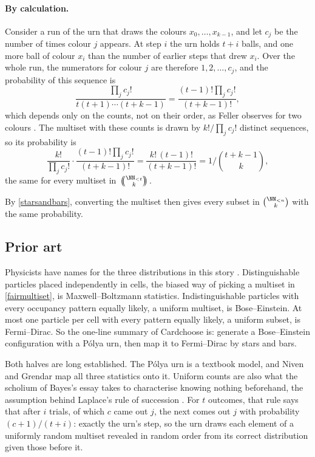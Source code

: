 \documentclass[letterpaper,11pt]{article}
\newcommand{\multichoose}[2]{
\left.\mathchoice
  {\left(\kern-0.48em\binom{#1}{#2}\kern-0.48em\right)}
  {\big(\kern-0.30em\binom{\smash{#1}}{\smash{#2}}\kern-0.30em\big)}
  {\left(\kern-0.30em\binom{\smash{#1}}{\smash{#2}}\kern-0.30em\right)}
  {\left(\kern-0.30em\binom{\smash{#1}}{\smash{#2}}\kern-0.30em\right)}
\right.}
\begin{document}
\paragraph{By calculation.} Consider a run of the urn that draws the
colours \(x_0, \ldots, x_{k-1}\), and let \(c_j\) be the number of
times colour \(j\) appears. At step \(i\) the urn holds \(t + i\)
balls, and one more ball of colour \(x_i\) than the number of earlier
steps that drew \(x_i\). Over the whole run, the numerators for colour \(j\) are
therefore \(1, 2, \ldots, c_j\), and the probability of this sequence
is
\begin{displaymath}
    \frac{\prod_j c_j!}{t (t + 1) \cdots (t + k - 1)}
    = \frac{(t - 1)! \prod_j c_j!}{(t + k - 1)!},
\end{displaymath}
which depends only on the counts, not on their order, as Feller
observes for two colours \cite[pp.~120--121]{feller}. The multiset
with these counts is drawn by \(k! / \prod_j c_j!\) distinct
sequences, so its probability is
\begin{displaymath}
    \frac{k!}{\prod_j c_j!} \cdot \frac{(t - 1)! \prod_j c_j!}{(t + k - 1)!}
    = \frac{k! \, (t - 1)!}{(t + k - 1)!}
    = 1 \Big/ \binom{t + k - 1}{k},
\end{displaymath}
the same for every multiset in \(\multichoose{\NN_{<t}}{k}\).

By \autoref{starsandbars}, converting the multiset then gives every
subset in \(\binom{\NN_{<n}}{k}\) with the same probability.

\subsection{Prior art}\label{priorart}

Physicists have names for the three distributions in this story
\cite[Chapter II \S 5]{feller}. Distinguishable particles placed
independently in cells, the biased way of picking a multiset in
\autoref{fairmultiset}, is Maxwell--Boltzmann statistics.
Indistinguishable particles with every occupancy pattern equally
likely, a uniform multiset, is Bose--Einstein. At most one particle
per cell with every pattern equally likely, a uniform subset, is
Fermi--Dirac. So the one-line summary of Cardchoose is: generate a
Bose--Einstein configuration with a P\'olya urn, then map it to
Fermi--Dirac by stars and bars.

Both halves are long established. The P\'olya urn is a textbook model,
and Niven and Grendar \cite{nivengrendar} map all three statistics onto
it. Uniform counts are also what the scholium of Bayes's
essay \cite{bayes} takes to characterise knowing nothing beforehand,
the assumption behind Laplace's rule of succession \cite[Chapter V \S
2, pp.~123--124]{feller}. For \(t\) outcomes, that rule says that after
\(i\) trials, of which \(c\) came out \(j\), the next comes out \(j\)
with probability \((c + 1) / (t + i)\): exactly the urn's step, so the
urn draws each element of a uniformly random multiset revealed in
random order from its correct distribution given those before it.
\end{document}
